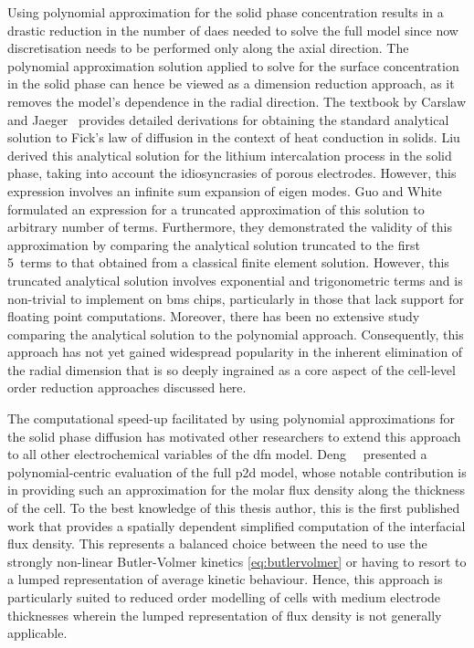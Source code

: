 Using polynomial  approximation for the  solid phase concentration results  in a
drastic reduction  in the number of  \glspl{dae} needed to solve  the full model
since now discretisation  needs to be performed only along  the axial direction.
The  polynomial  approximation  solution  applied   to  solve  for  the  surface
concentration in  the solid phase can  hence be viewed as  a dimension reduction
approach, as  it removes  the model's  dependence in  the radial  direction. The
textbook by Carslaw and  Jaeger~\cite{Carslaw1947} provides detailed derivations
for obtaining the standard analytical solution to Fick's law of diffusion in the
context of heat conduction in solids. Liu~\cite{Liu2006} derived this analytical
solution for the  lithium intercalation process in the solid  phase, taking into
account  the idiosyncrasies  of porous  electrodes.
However, this  expression involves an  infinite sum
expansion of eigen modes. Guo  and White~\cite{Guo2012} formulated an expression
for a  truncated approximation of  this solution  to arbitrary number  of terms.
Furthermore, they demonstrated  the validity of this  approximation by comparing
the analytical solution truncated  to the first 5~terms to  that obtained from a
classical finite  element solution. However, this  truncated analytical solution
involves exponential and trigonometric terms  and is non-trivial to implement on
\gls{bms}  chips, particularly  in those  that lack  support for  floating point
computations.  Moreover,  there  has  been  no  extensive  study  comparing  the
analytical solution to the polynomial  approach. Consequently, this approach has
not yet gained  widespread popularity in the inherent elimination  of the radial
dimension that is so  deeply ingrained as a core aspect  of the cell-level order
reduction  approaches  discussed  here.

The computational  speed-up facilitated  by using polynomial  approximations for
the  solid  phase diffusion  has  motivated  other  researchers to  extend  this
approach  to  all  other  electrochemical  variables  of  the  \gls{dfn}  model.
Deng~\etal{}~\cite{Deng2018}  presented a  polynomial-centric evaluation  of the
full  \gls{p2d}  model, whose  notable  contribution  is  in providing  such  an
approximation for the molar flux density along the thickness of the cell. To the
best knowledge  of this  thesis author,  this is the  first published  work that
provides a  spatially dependent simplified  computation of the  interfacial flux
density. This represents a balanced choice  between the need to use the strongly
non-linear Butler-Volmer kinetics \cref{eq:butlervolmer} or  having to resort to
a lumped  representation of average  kinetic behaviour. Hence, this  approach is
particularly suited  to reduced order  modelling of cells with  medium electrode
thicknesses wherein the  lumped representation of flux density  is not generally
applicable.

